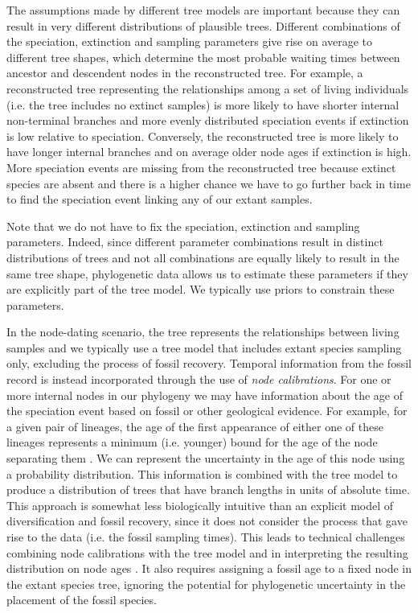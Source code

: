 The assumptions made by different tree models are important because they can result in very different distributions of plausible trees.
Different combinations of the speciation, extinction and sampling parameters give rise on average to different tree shapes, which determine the most probable waiting times between ancestor and descendent nodes 
in the reconstructed tree.
For example, a reconstructed tree representing the relationships among a set of living individuals (i.e. the tree includes no extinct samples) is more likely to have shorter internal non-terminal branches and more evenly distributed speciation events if extinction is low relative to speciation.
Conversely, the reconstructed tree is more likely to have longer internal branches and on average older node ages if extinction is high.
More speciation events are missing from the reconstructed tree because extinct species are absent and there is a higher chance we have to go further back in time to find the speciation event linking any of our extant samples.

Note that we do not have to fix the speciation, extinction and sampling parameters. 
Indeed, since different parameter combinations result in distinct distributions of trees and not all combinations are equally likely to result in the same tree shape, phylogenetic data  allows us to estimate these parameters if they are explicitly part of the tree model. 
We typically use priors to constrain these parameters.

In the node-dating scenario, the tree represents the relationships between living samples and we typically use a tree model that includes extant species sampling only, excluding the process of fossil recovery.
Temporal information from the fossil record is instead incorporated through the use of \textit{node calibrations}. 
For one or more internal nodes in our phylogeny we may have information about the age of the speciation event based on fossil or other geological evidence.
For example, for a given pair of lineages, the age of the first appearance of either one of these lineages represents a minimum (i.e. younger) bound for the age of the node separating them \citep{Parham2012}.
We can represent the uncertainty in the age of this node using a probability distribution. %
This information is combined with the tree model to produce a distribution of trees that have branch lengths in units of absolute time.
This approach is somewhat less biologically intuitive than an explicit model of diversification and fossil recovery, since it does not consider the process that gave rise to the data (i.e. the fossil sampling times).
This leads to technical challenges combining node calibrations with the tree model and in interpreting the resulting distribution on node ages \citep{Heled2012,Warnock2015}.
It also requires assigning a fossil age to a fixed node in the extant species tree, ignoring the potential for phylogenetic uncertainty in the placement of the fossil species.

